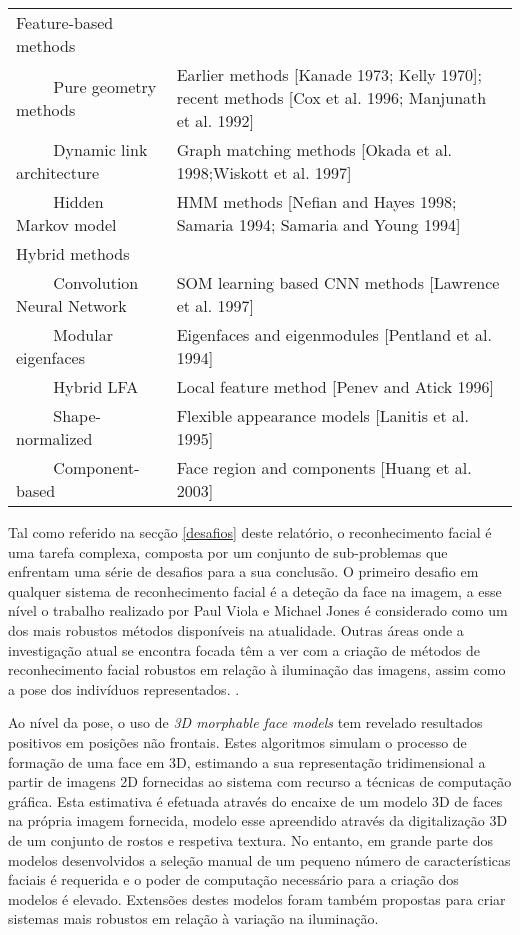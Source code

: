 \begin{center}
\begin{table}
\begin{tabular}{l p{8cm}}
Feature-based methods \\
$\qquad$        Pure geometry methods      & Earlier methods [Kanade 1973; Kelly 1970]; recent methods [Cox et al. 1996; Manjunath et al. 1992] \\ 
$\qquad$        Dynamic link architecture  & Graph matching methods [Okada et al. 1998;Wiskott et al. 1997] \\ 
$\qquad$        Hidden Markov model        & HMM methods [Nefian and Hayes 1998; Samaria 1994; Samaria and Young 1994] \\

Hybrid methods \\
$\qquad$        Convolution Neural Network & SOM learning based CNN methods [Lawrence et al. 1997] \\ 
$\qquad$        Modular eigenfaces         & Eigenfaces and eigenmodules [Pentland et al. 1994] \\ 
$\qquad$        Hybrid LFA                 & Local feature method [Penev and Atick 1996] \\ 
$\qquad$        Shape-normalized           & Flexible appearance models [Lanitis et al. 1995] \\ 
$\qquad$        Component-based            & Face region and components [Huang et al. 2003] \\
        \hline
    \end{tabular}
	\label{tabelaZhao}
\end{table}
\end{center}
 
 Tal como referido na secção \ref{desafios} deste relatório, o reconhecimento facial é uma tarefa complexa, composta por um conjunto de sub-problemas que enfrentam uma série de desafios para a sua conclusão. O primeiro desafio em qualquer sistema de reconhecimento facial é a deteção da face na imagem, a esse nível o trabalho realizado por Paul Viola e Michael Jones \citep{Viola2004} é considerado como um dos mais robustos métodos disponíveis na atualidade. Outras áreas onde a investigação atual se encontra focada têm a ver com a criação de métodos de reconhecimento facial robustos em relação à iluminação das imagens, assim como a pose dos indivíduos representados. \citep{Chellappa2010}.
 
 Ao nível da pose, o uso de  \textit{3D morphable face models} \cite{Blanz2003} tem revelado resultados positivos em posições não frontais. Estes algoritmos simulam o processo de formação de uma face em 3D, estimando a sua representação tridimensional a partir de imagens 2D fornecidas ao sistema com recurso a técnicas de computação gráfica. Esta estimativa é efetuada através do encaixe de um modelo 3D de faces na própria imagem fornecida, modelo esse apreendido através da digitalização 3D de um conjunto de rostos e respetiva textura. No entanto, em grande parte dos modelos desenvolvidos a seleção manual de um pequeno número de características faciais é requerida e o poder de computação necessário para a criação dos modelos é elevado. Extensões destes modelos foram também propostas para criar sistemas mais robustos em relação à variação na iluminação.  
 
